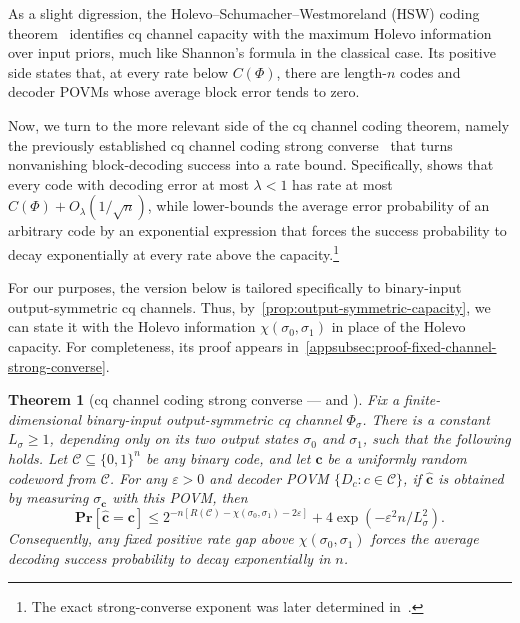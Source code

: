 \documentclass[11pt]{article}
\renewcommand{\leq}{\leqslant}
\renewcommand{\geq}{\geqslant}
\newtheorem{theorem}{Theorem}
\theoremstyle{remark}
\newcommand{\cC}{\mathcal{C}}
\newcommand{\Prb}{\mathbf{Pr}}
\newcommand{\bits}{\{0,1\}}
\newcommand{\bchat}{\hat{\mathbf{c}}}
\newcommand{\bc}{\mathbf{c}}
\newcommand{\eps}{\varepsilon}
\begin{document}
As a slight digression, the Holevo--Schumacher--Westmoreland (HSW) coding theorem~\cite{Hol98,SW97,HJSWW96} identifies cq channel capacity with the maximum Holevo information over input priors, much like Shannon's formula in the classical case. Its positive side states that, at every rate below $C(\Phi)$, there are length-$n$ codes and decoder POVMs whose average block error tends to zero. 

Now, we turn to the more relevant side of the cq channel coding theorem, namely the previously established cq channel coding strong converse~\cite{Win99a,ON99,MO17} that turns nonvanishing block-decoding success into a rate bound. Specifically, \cite[Theorem~13]{Win99a} shows that every code with decoding error at most $\lambda < 1$ has rate at most $C(\Phi)+O_\lambda(1/\sqrt{n})$, while \cite[Theorem~1]{ON99} lower-bounds the average error probability of an arbitrary code by an exponential expression that forces the success probability to decay exponentially at every rate above the capacity.\footnote{The exact strong-converse exponent was later determined in~\cite{MO17}.} 

For our purposes, the version below is tailored specifically to binary-input output-symmetric cq channels. Thus, by~\cref{prop:output-symmetric-capacity}, we can state it with the Holevo information $\chi(\sigma_0,\sigma_1)$ in place of the Holevo capacity. For completeness, its proof appears in~\cref{appsubsec:proof-fixed-channel-strong-converse}.

\begin{theorem}[{cq channel coding strong converse --- \cite[Theorem~13]{Win99a} and \cite[Theorem~1]{ON99}}]
\label{thm:cq-strong-converse}
Fix a finite-dimensional binary-input output-symmetric cq channel $\Phi_\sigma$. There is a constant $L_\sigma \geq 1$, depending only on its two output states $\sigma_0$ and $\sigma_1$, such that the following holds. Let $\cC \subseteq \bits^n$ be any binary code, and let $\bc$ be a uniformly random codeword from $\cC$. For any $\eps > 0$ and decoder POVM $\{D_c : c \in \cC\}$, if $\bchat$ is obtained by measuring $\sigma_{\bc}$ with this POVM, then
\begin{equation}
\label{eq:fixed-channel-exponential-converse}
\Prb[\bchat = \bc] \leq 2^{-n[R(\cC)-\chi(\sigma_0,\sigma_1)-2\eps]} + 4\exp\left(-\eps^2n/L_\sigma^2\right).
\end{equation}
Consequently, any fixed positive rate gap above $\chi(\sigma_0,\sigma_1)$ forces the average decoding success probability to decay exponentially in $n$.
\end{theorem}
\end{document}
